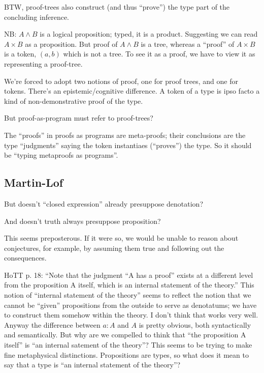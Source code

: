 BTW, proof-trees also construct (and thus ``prove'') the type part of
the concluding inference.

NB: \(A\land B\) is a logical proposition; typed, it is a product.
Suggesting we can read \(A\times B\) as a proposition. But proof of
\(A\land B\) is a tree, whereas a ``proof'' of \(A\times B\) is a
token, \((a,b)\) which is not a tree. To see it as a proof, we have to
view it as representing a proof-tree.

We're forced to adopt two notions of proof, one for proof trees, and
one for tokens. There's an epistemic/cognitive difference. A token of
a type is ipso facto a kind of non-demonstrative proof of the type.

But proof-as-program must refer to proof-trees?

The ``proofs'' in proofs as programs are meta-proofs; their
conclusions are the type ``judgments'' saying the token instantiaes
(``proves'') the type. So it should be ``typing metaproofs as
programs''.

\subsection{Martin-Lof}


But doesn't ``closed expression'' already presuppose denotation?

And doesn't truth always presuppose proposition?


This seems preposterous. If it were so, we would be unable to reason
about conjectures, for example, by assuming them true and following
out the consequences.

HoTT p. 18: \enquote{Note that the judgment “A has a proof” exists at
  a different level from the proposition A itself, which is an
  internal statement of the theory.} This notion of ``internal
statement of the theory'' seems to reflect the notion that we cannot
be ``given'' propositions from the outside to serve as denotatums; we
have to construct them somehow within the theory. I don't think that
works very well. Anyway the difference between \(a:A\) and \(A\) is
pretty obvious, both syntactically and semantically. But why are we
compelled to think that ``the proposition A itself'' is ``an internal
satement of the theory''? This seems to be trying to make fine
metaphysical distinctions. Propositions are types, so what does it
mean to say that a type is ``an internal statement of the theory''?

